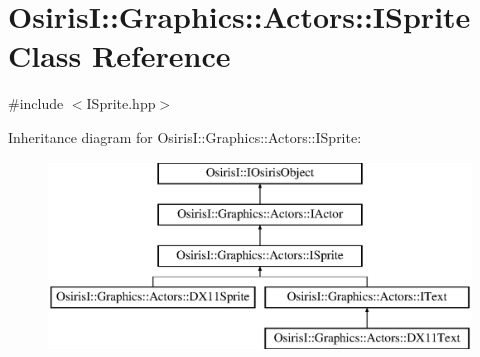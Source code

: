 \hypertarget{class_osiris_i_1_1_graphics_1_1_actors_1_1_i_sprite}{\section{Osiris\-I\-:\-:Graphics\-:\-:Actors\-:\-:I\-Sprite Class Reference}
\label{class_osiris_i_1_1_graphics_1_1_actors_1_1_i_sprite}
}


{\ttfamily \#include $<$I\-Sprite.\-hpp$>$}

Inheritance diagram for Osiris\-I\-:\-:Graphics\-:\-:Actors\-:\-:I\-Sprite\-:\begin{figure}[H]
\begin{center}
\leavevmode
\includegraphics[height=5.000000cm]{class_osiris_i_1_1_graphics_1_1_actors_1_1_i_sprite}
\end{center}
\end{figure}
